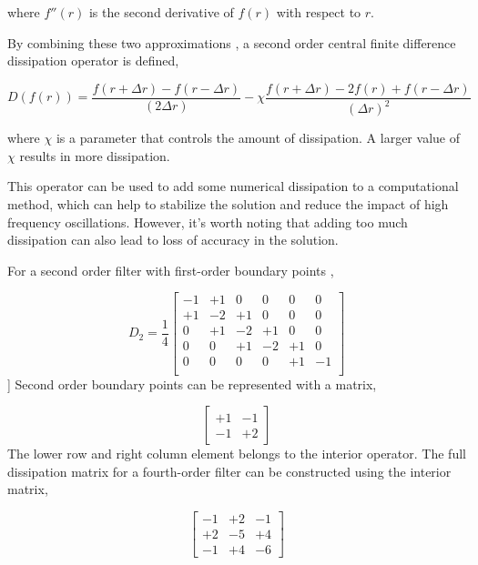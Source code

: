 \documentclass[a4paper]{report}
\begin{document}
where $f''(r)$ is the second derivative of $f(r)$ with respect to $r$.

By combining these two approximations , a second order central finite difference
dissipation operator is defined, 

\begin{equation}
    D(f(r)) = \frac{f(r + \Delta r) - f(r - \Delta r)}{(2\Delta r)} - \chi \frac{f(r + \Delta r) - 2f(r) + f(r - \Delta r)}{(\Delta r)^2}
\end{equation}

where $\chi$ is a parameter that controls the amount of dissipation. A larger value of $\chi$ results in more dissipation.

This operator can be used to add some numerical dissipation to a computational method, 
which can help to stabilize the solution and reduce the impact of high frequency 
oscillations. However, it's worth noting that adding too much dissipation can also lead to loss of accuracy in the solution.


For a second order filter with first-order boundary points ,

\begin{equation}
    D_2  =
    \frac{1}{4}
    \begin{bmatrix}
        -1  & +1 & 0  & 0  & 0  & 0 \\ 
        +1 & -2  & +1 & 0  & 0  & 0 \\ 
        0  & +1  & -2  & +1 & 0  & 0 \\ 
        0  & 0  & +1 & -2  & +1  & 0 \\ 
        0  & 0  & 0  & 0  & +1 & -1 \\ 
    \end{bmatrix}
\end{equation}]
Second order boundary points can be represented with a matrix,

\begin{equation}
    \begin{bmatrix}
        +1 & -1 \\
        -1 & +2 
    \end{bmatrix} 
    \label{eqn:4thBC}
\end{equation}
The lower row and right column element belongs to the interior operator. The 
full dissipation matrix for a fourth-order filter can be constructed using the interior matrix,

\begin{equation}
    \begin{bmatrix}
        -1 & +2 & -1 \\
        +2 & -5 & +4 \\ 
        -1 & +4 & -6  
    \end{bmatrix} 
    \label{eqn:4thInterior}
\end{equation}
\end{document}
